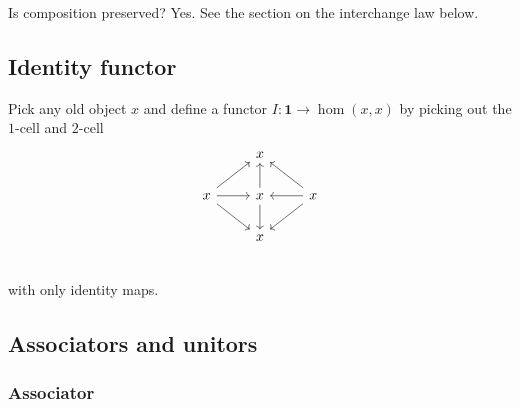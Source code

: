 \documentclass[12pt]{article}
\newcommand{\from}{\colon}
\renewcommand{\(}{\left(}
\renewcommand{\)}{\right)}
\renewcommand{\{}{\left\lbrace}
\renewcommand{\}}{\right\rbrace}
\theoremstyle{remark}
\theoremstyle{definition}
\begin{document}
Is composition preserved?  Yes.  See the section on the interchange law below.  

\subsection*{Identity functor}

Pick any old object $x$ and define a functor $I \from \mathbf{1} \to \hom (x,x)$ by picking out the $1$-cell and $2$-cell
\[
		\begin{tikzcd}
			{} &
			{x} &
			{} \\
			{x} 
				\ar[ur] 
				\ar[r]
				\ar[dr] &
			{x} 
				\ar[u,]
				\ar[d,] &
			{x} 
				\ar[ul]
				\ar[l]
				\ar[dl] \\
			{} &
			{x} &
			{} \\
		\end{tikzcd}
\]
with only identity maps. 

\subsection*{Associators and unitors}

\subsubsection*{Associator}
\end{document}
